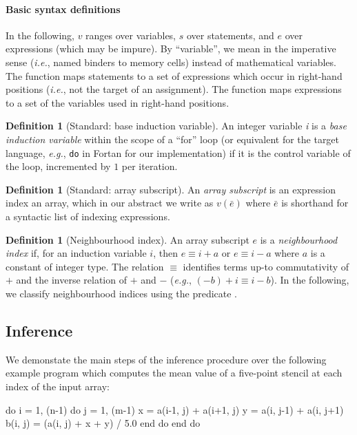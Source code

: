 \documentclass[9pt]{sigplanconf}
\newcounter{block}
\theoremstyle{definition}
\newtheorem{definition}[block]{Definition}
\newcommand{\ie}{\emph{i.e.}}
\newcommand{\eg}{\emph{e.g.}}
\begin{document}
\renewcommand*{\arraystretch}{0.8}
\paragraph{Basic syntax definitions} In the following, $v$
  ranges over variables, $s$ over statements, and $e$ over expressions
  (which may be impure).  By ``variable'', we mean in the imperative
  sense (\ie{}, named binders to memory cells) instead of mathematical
  variables. The function \rhsExp{} maps statements to a set of
  expressions which occur in right-hand positions (\ie{}, not the
  target of an assignment). The function \var{} maps expressions to a
  set of the variables used in right-hand positions. 

\begin{definition}[Standard: base induction variable]
An integer variable \textit{i} is a \emph{base induction variable} 
within the scope of a ``for'' loop (or equivalent for the target
language, \eg{}, \texttt{do} in Fortan for our implementation) if it
is the control variable of the loop, incremented by $1$ per
iteration. 
\end{definition}

\begin{definition}[Standard: array subscript]
An \emph{array subscript} is an expression index an array, which in
our abstract we write as $v(\bar{e})$ where $\bar{e}$ is shorthand for
a syntactic list of indexing expressions. 
\end{definition}

\begin{definition}[Neighbourhood index]
An array subscript $e$ is a \emph{neighbourhood index} if,
for an induction variable $i$, then $e \equiv i + a$ or $e \equiv i - a$
where $a$ is a constant of integer type. The relation $\equiv$ identifies terms
up-to commutativity of $+$ and the inverse
relation of $+$ and $-$ (\eg{}, $(-b) + i \equiv i - b$).
In the following, we classify neighbourhood indices 
using the predicate \neigh{}.
\end{definition}

\subsection{Inference}

We demonstate the main steps of the inference procedure over the
following example program which computes the mean value 
of a five-point stencil at each index of the input array:
\begin{ExmVerbatim}
do i = 1, (n-1)
   do j = 1, (m-1)
      x       = a(i-1, j) + a(i+1, j) 
      y       = a(i, j-1) + a(i, j+1)
      b(i, j) = (a(i, j) + x + y) / 5.0
   end do
end do
\end{ExmVerbatim}
\end{document}
